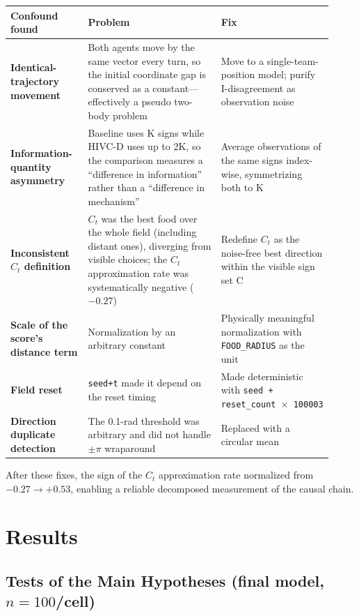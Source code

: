 \documentclass[11pt]{article}
\newcommand{\Ct}{\ensuremath{C_t}}
\begin{document}
\begin{longtable}{@{}p{0.22\linewidth} p{0.38\linewidth} p{0.32\linewidth}@{}}
\toprule
Confound found & Problem & Fix \\
\midrule
\textbf{Identical-trajectory movement} & Both agents move by the same vector every turn, so the initial coordinate gap is conserved as a constant---effectively a pseudo two-body problem & Move to a single-team-position model; purify I-disagreement as observation noise \\
\textbf{Information-quantity asymmetry} & Baseline uses K signs while HIVC-D uses up to 2K, so the comparison measures a ``difference in information'' rather than a ``difference in mechanism'' & Average observations of the same signs index-wise, symmetrizing both to K \\
\textbf{Inconsistent \Ct{} definition} & \Ct{} was the best food over the whole field (including distant ones), diverging from visible choices; the \Ct{} approximation rate was systematically negative ($-0.27$) & Redefine \Ct{} as the noise-free best direction within the visible sign set C \\
\textbf{Scale of the score's distance term} & Normalization by an arbitrary constant & Physically meaningful normalization with \texttt{FOOD\_RADIUS} as the unit \\
\textbf{Field reset} & \texttt{seed+t} made it depend on the reset timing & Made deterministic with \texttt{seed + reset\_count $\times$ 100003} \\
\textbf{Direction duplicate detection} & The 0.1-rad threshold was arbitrary and did not handle $\pm\pi$ wraparound & Replaced with a circular mean \\
\bottomrule
\end{longtable}

After these fixes, the sign of the \Ct{} approximation rate normalized from \textbf{$-0.27 \to +0.53$}, enabling a reliable decomposed measurement of the causal chain.

\section{Results}

\subsection{Tests of the Main Hypotheses (final model, $n=100$/cell)}
\end{document}
